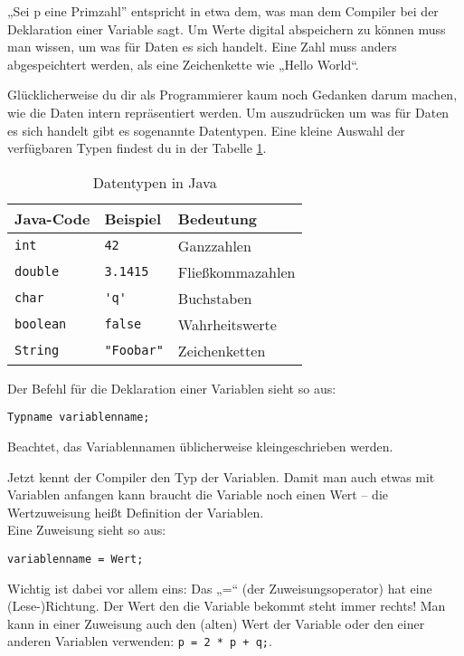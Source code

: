 „Sei p eine Primzahl” entspricht in etwa dem, was man dem Compiler bei der Deklaration einer Variable sagt. Um Werte digital abspeichern zu können muss man wissen, um was für Daten es sich handelt. Eine Zahl muss anders abgespeichtert werden, als eine Zeichenkette wie „Hello World“.

Glücklicherweise du dir als Programmierer kaum noch Gedanken darum machen, wie die Daten intern repräsentiert werden.
Um auszudrücken um was für Daten es sich handelt gibt es sogenannte Datentypen. Eine kleine Auswahl der verfügbaren Typen findest du in der Tabelle \ref{Datentypen}. \\

\begin{table}
\centering
\begin{tabular}{l|l|l}
Java-Code & Beispiel & Bedeutung \\ \hline
\lstinline$int$ & \lstinline$42$ & Ganzzahlen \\
\lstinline$double$ & \lstinline$3.1415$ & Fließkommazahlen \\
\lstinline$char$ & \lstinline$'q'$ & Buchstaben \\
\lstinline$boolean$ & \lstinline$false$ & Wahrheitswerte \\
\lstinline$String$ & \lstinline$"Foobar"$ & Zeichenketten \\

\end{tabular}
\caption{Datentypen in Java}
\label{Datentypen}
\end{table}

Der Befehl für die Deklaration einer Variablen sieht so aus: 
\begin{lstlisting}
Typname variablenname;
\end{lstlisting}
Beachtet, das Variablennamen üblicherweise kleingeschrieben werden.

Jetzt kennt der Compiler den Typ der Variablen. 
Damit man auch etwas mit Variablen anfangen kann braucht die Variable noch einen Wert – die Wertzuweisung heißt Definition der Variablen. \\
Eine Zuweisung sieht so aus: 
\begin{lstlisting}
variablenname = Wert;
\end{lstlisting}
Wichtig ist dabei vor allem eins: Das „=“ (der Zuweisungsoperator) hat eine (Lese-)Richtung. Der Wert den die Variable bekommt steht immer rechts!
Man kann in einer Zuweisung auch den (alten) Wert der Variable oder den einer anderen Variablen verwenden: \lstinline$p = 2 * p + q;$.

